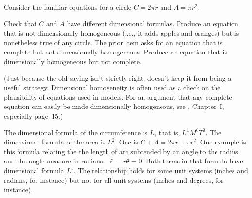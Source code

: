 \begin{exercises}
    Consider the familiar equations for a circle $C=2\pi r$ and $A=\pi r^2$.
    \begin{exparts}
      \partsitem Check that $C$ and $A$ have different dimensional formulas.
      \partsitem Produce an equation that is not
        dimensionally homogeneous (i.e., 
        it adds apples and oranges) but is nonetheless true of any circle.
      \partsitem The prior item asks for an equation that is complete but
        not dimensionally homogeneous.
        Produce an equation that is dimensionally homogeneous but not complete.
    \end{exparts}
    (Just because the old saying isn't strictly right, doesn't 
    keep it from being a useful strategy.
    Dimensional homogeneity is often used as a check on the plausibility of 
    equations used in models.
    For an argument that any complete equation can easily be made 
     dimensionally homogeneous, see \cite{Bridgman}, Chapter~I, 
     especially page~15.)
    \begin{answer}
      \begin{exparts}
        \partsitem The dimensional formula of the circumference is $L$,
          that is, $L^1M^0T^0$.
          The dimensional formula of the area is $L^2$.
        \partsitem One is $C+A=2\pi r + \pi r^2$.
        \partsitem One example is this formula relating the  
           the length of arc subtended by an angle to the radius and the
           angle measure in radians:~$\ell-r\theta=0$.
           Both terms in that formula have dimensional
           formula $L^1$.
           The relationship holds for some
           unit systems (inches and radians, for instance) but not for all
           unit systems (inches and degrees, for instance).  
      \end{exparts}
    \end{answer}
\end{exercises}
\endinput